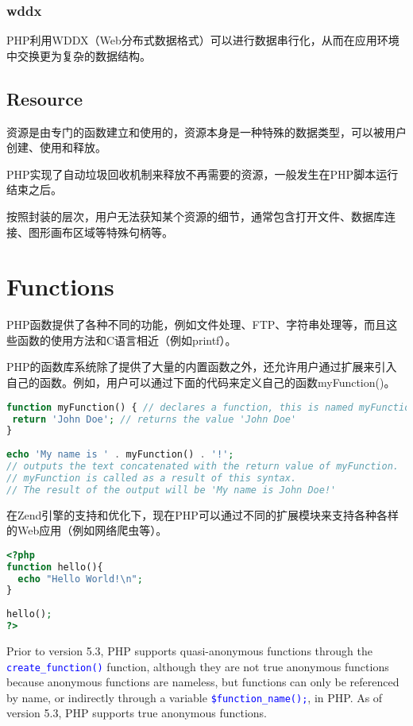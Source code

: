 \subsection{wddx}

PHP利用WDDX（Web分布式数据格式）可以进行数据串行化，从而在应用环境中交换更为复杂的数据结构。

\section{Resource}


资源是由专门的函数建立和使用的，资源本身是一种特殊的数据类型，可以被用户创建、使用和释放。

PHP实现了自动垃圾回收机制来释放不再需要的资源，一般发生在PHP脚本运行结束之后。

按照封装的层次，用户无法获知某个资源的细节，通常包含打开文件、数据库连接、图形画布区域等特殊句柄等。



\chapter{Functions}

PHP函数提供了各种不同的功能，例如文件处理、FTP、字符串处理等，而且这些函数的使用方法和C语言相近（例如printf）。

PHP的函数库系统除了提供了大量的内置函数之外，还允许用户通过扩展来引入自己的函数。例如，用户可以通过下面的代码来定义自己的函数myFunction()。


\begin{lstlisting}[language=PHP]
function myFunction() { // declares a function, this is named myFunction
 return 'John Doe'; // returns the value 'John Doe'
}
 
echo 'My name is ' . myFunction() . '!'; 
// outputs the text concatenated with the return value of myFunction.
// myFunction is called as a result of this syntax.
// The result of the output will be 'My name is John Doe!'
\end{lstlisting}

在Zend引擎的支持和优化下，现在PHP可以通过不同的扩展模块来支持各种各样的Web应用（例如网络爬虫等）。

\begin{lstlisting}[language=PHP]
<?php
function hello(){
  echo "Hello World!\n";
}
 
hello();
?>
\end{lstlisting}

Prior to version 5.3, PHP supports quasi-anonymous functions through the \textcolor{Blue}{\texttt{create\_function()}} function, although they are not true anonymous functions because anonymous functions are nameless, but functions can only be referenced by name, or indirectly through a variable \textcolor{Blue}{\texttt{\$function\_name();}}, in PHP. As of version 5.3, PHP supports true anonymous functions.


